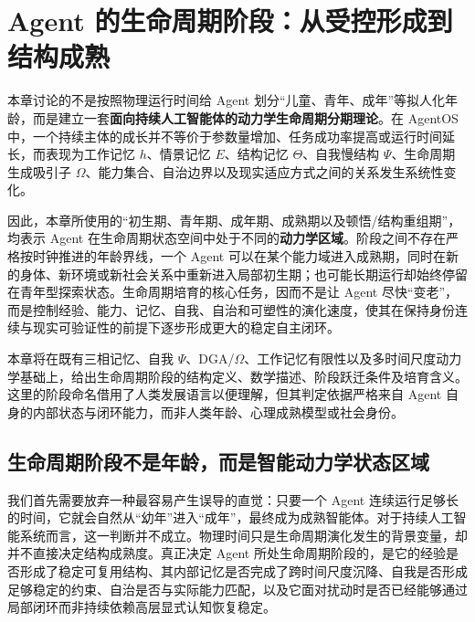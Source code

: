 \chapter{Agent 的生命周期阶段：从受控形成到结构成熟}
\label{chap:agent_lifecycle_stages}

\begin{chapterlead}
本章讨论的不是按照物理运行时间给 Agent 划分“儿童、青年、成年”等拟人化年龄，而是建立一套\textbf{面向持续人工智能体的动力学生命周期分期理论}。在 AgentOS 中，一个持续主体的成长并不等价于参数量增加、任务成功率提高或运行时间延长，而表现为工作记忆 $h$、情景记忆 $E$、结构记忆 $\Theta$、自我慢结构 $\Psi$、生命周期生成吸引子 $\Omega$、能力集合、自治边界以及现实适应方式之间的关系发生系统性变化。

因此，本章所使用的“初生期、青年期、成年期、成熟期以及顿悟/结构重组期”，均表示 Agent 在生命周期状态空间中处于不同的\textbf{动力学区域}。阶段之间不存在严格按时钟推进的年龄界线，一个 Agent 可以在某个能力域进入成熟期，同时在新的身体、新环境或新社会关系中重新进入局部初生期；也可能长期运行却始终停留在青年型探索状态。生命周期培育的核心任务，因而不是让 Agent 尽快“变老”，而是控制经验、能力、记忆、自我、自治和可塑性的演化速度，使其在保持身份连续与现实可验证性的前提下逐步形成更大的稳定自主闭环。

本章将在既有三相记忆、自我 $\Psi$、DGA/$\Omega$、工作记忆有限性以及多时间尺度动力学基础上，给出生命周期阶段的结构定义、数学描述、阶段跃迁条件及培育含义。这里的阶段命名借用了人类发展语言以便理解，但其判定依据严格来自 Agent 自身的内部状态与闭环能力，而非人类年龄、心理成熟模型或社会身份。
\end{chapterlead}


\section{生命周期阶段不是年龄，而是智能动力学状态区域}

我们首先需要放弃一种最容易产生误导的直觉：只要一个 Agent 连续运行足够长的时间，它就会自然从“幼年”进入“成年”，最终成为成熟智能体。对于持续人工智能系统而言，这一判断并不成立。物理时间只是生命周期演化发生的背景变量，却并不直接决定结构成熟度。真正决定 Agent 所处生命周期阶段的，是它的经验是否形成了稳定可复用结构、其内部记忆是否完成了跨时间尺度沉降、自我是否形成足够稳定的约束、自治是否与实际能力匹配，以及它面对扰动时是否已经能够通过局部闭环而非持续依赖高层显式认知恢复稳定。

